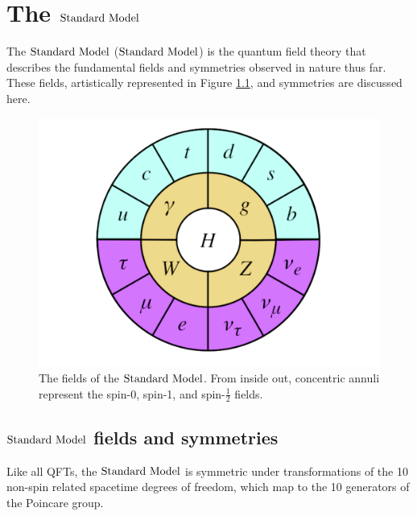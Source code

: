\chapter{The $\text{Standard\ Model}$}
\label{chap:SM}
The $\text{Standard\ Model}$ ($\text{Standard\ Model}$) is the quantum field theory that describes the fundamental fields and symmetries observed in nature thus far.  These fields, artistically represented in Figure \ref{fig:SMcircle}, and symmetries are discussed here. 
\begin{figure}[h]
\centering
\includegraphics[width=.6\linewidth]{figures/SM/StandardModel2.png}
\caption{The fields of the $\text{Standard\ Model}$. From inside out, concentric annuli represent the spin-0, spin-1, and spin-$\frac{1}{2}$ fields.}
\label{fig:SMcircle}
\end{figure}

\section{$\text{Standard\ Model}$ fields and symmetries}
Like all QFTs, the $\text{Standard\ Model}$ is symmetric under transformations of the 10 non-spin related spacetime degrees of freedom, which map to the 10 generators of the Poincare group. 

